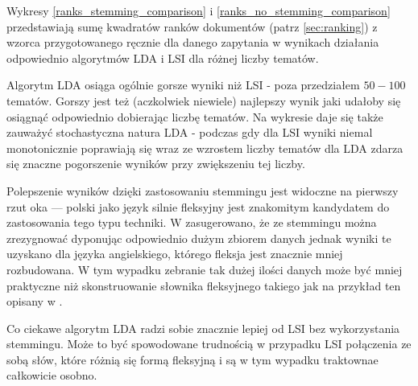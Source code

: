 \documentclass[11pt,a4paper]{article}
\begin{document}
Wykresy \ref{ranks_stemming_comparison} i \ref{ranks_no_stemming_comparison}
przedstawiają sumę kwadratów ranków dokumentów (patrz \ref{sec:ranking}) z
wzorca przygotowanego ręcznie dla danego zapytania w wynikach działania
odpowiednio algorytmów LDA i LSI dla różnej liczby tematów.

Algorytm LDA osiąga ogólnie gorsze wyniki niż LSI - poza przedziałem $50 - 100$
tematów. Gorszy jest też (aczkolwiek niewiele) najlepszy wynik jaki udałoby się
osiągnąć odpowiednio dobierając liczbę tematów. Na wykresie daje się także
zauważyć stochastyczna natura LDA - podczas gdy dla LSI wyniki niemal
monotonicznie poprawiają się wraz ze wzrostem liczby tematów dla LDA zdarza się
znaczne pogorszenie wyników przy zwiększeniu tej liczby.

Polepszenie wyników dzięki zastosowaniu stemmingu jest widoczne na pierwszy
rzut oka --- polski jako język silnie fleksyjny jest znakomitym kandydatem do
zastosowania tego typu techniki. W \cite{manning-schuetze} zasugerowano, że ze
stemmingu można zrezygnować dyponując odpowiednio dużym zbiorem danych jednak
wyniki te uzyskano dla języka angielskiego, którego fleksja jest znacznie mniej
rozbudowana. W tym wypadku zebranie tak dużej ilości danych może być mniej
praktyczne niż skonstruowanie słownika fleksyjnego takiego jak na przykład ten
opisany w \cite{lubaszewski-slownik}.

Co ciekawe algorytm LDA radzi sobie znacznie lepiej od LSI bez wykorzystania
stemmingu.  Może to być spowodowane trudnością w przypadku LSI połączenia ze
sobą słów, które różnią się formą fleksyjną i są w tym wypadku traktownae
całkowicie osobno.
\end{document}
